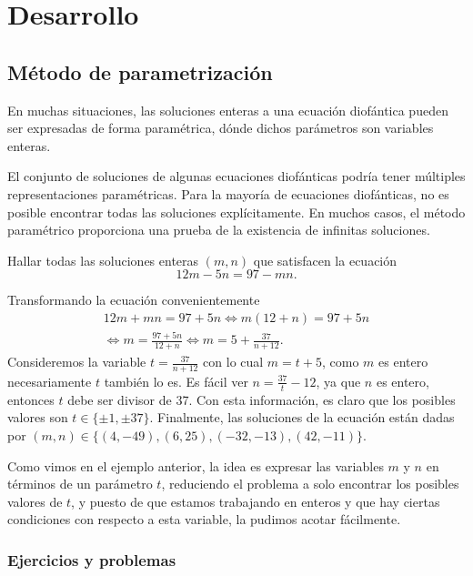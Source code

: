 \section{Desarrollo}

\subsection{Método de parametrización}

En muchas situaciones, las soluciones enteras a una ecuación diofántica pueden ser expresadas de forma paramétrica, dónde dichos parámetros son variables enteras.

El conjunto de soluciones de algunas ecuaciones diofánticas podría tener múltiples representaciones paramétricas.
Para la mayoría de ecuaciones diofánticas, no es posible encontrar todas las soluciones explícitamente.
En muchos casos, el método paramétrico proporciona una prueba de la existencia de infinitas soluciones.

\begin{example}
    Hallar todas las soluciones enteras $(m,n)$ que satisfacen la ecuación
    \[
        12m - 5n = 97 - mn.
    \]
\end{example}
\begin{solution}
    Transformando la ecuación convenientemente
    \begin{multline*}
        12m + mn = 97 + 5n \iff
        m(12 + n) = 97 + 5n\\ \iff
        m = \frac{97 + 5n}{12 + n} \iff
        m = 5 + \frac{37}{n + 12}.
    \end{multline*}
    Consideremos la variable $t = \frac{37}{n + 12}$ con lo cual $m = t + 5$, como $m$ es entero necesariamente $t$
    también lo es.
    Es fácil ver $n = \frac{37}{t} - 12$, ya que $n$ es entero, entonces $t$ debe ser divisor de 37.
    Con esta información, es claro que los posibles valores son $t \in \{\pm 1, \pm 37 \}$.
    Finalmente, las soluciones de la ecuación están dadas por $(m,n) \in \{(4, -49), (6, 25), (-32, -13), (42, -11)\}$.
\end{solution}

Como vimos en el ejemplo anterior, la idea es expresar las variables $m$ y $n$ en términos de un parámetro $t$,
reduciendo el problema a solo encontrar los posibles valores de $t$, y puesto de que estamos trabajando en enteros
y que hay ciertas condiciones con respecto a esta variable, la pudimos acotar fácilmente.

\subsubsection{Ejercicios y problemas}

